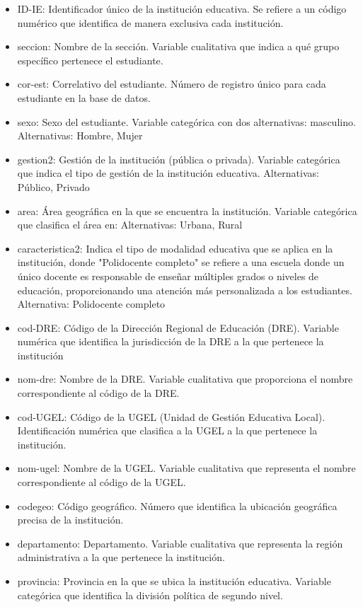 \documentclass[
]{article}
\begin{document}
\begin{itemize}
    \item ID-IE: Identificador único de la institución educativa. Se refiere a un código numérico que identifica de manera exclusiva cada institución.
    \item seccion: Nombre de la sección. Variable cualitativa que indica a qué grupo específico pertenece el estudiante.
    \item cor-est: Correlativo del estudiante. Número de registro único para cada estudiante en la base de datos.
    \item sexo: Sexo del estudiante. Variable categórica con dos alternativas: masculino. Alternativas: Hombre, Mujer
    \item gestion2: Gestión de la institución (pública o privada). Variable categórica que indica el tipo de gestión de la institución educativa. Alternativas: Público, Privado
    \item area: Área geográfica en la que se encuentra la institución. Variable categórica que clasifica el área en: Alternativas: Urbana, Rural
    \item caracteristica2: Indica el tipo de modalidad educativa que se aplica en la institución, donde "Polidocente completo" se refiere a una escuela donde un único docente es responsable de enseñar múltiples grados o niveles de educación, proporcionando una atención más personalizada a los estudiantes. Alternativa: Polidocente completo
    \item cod-DRE: Código de la Dirección Regional de Educación (DRE). Variable numérica que identifica la jurisdicción de la DRE a la que pertenece la institución
    \item nom-dre: Nombre de la DRE. Variable cualitativa que proporciona el nombre correspondiente al código de la DRE.
    \item cod-UGEL: Código de la UGEL (Unidad de Gestión Educativa Local). Identificación numérica que clasifica a la UGEL a la que pertenece la institución.
    \item nom-ugel: Nombre de la UGEL. Variable cualitativa que representa el nombre correspondiente al código de la UGEL.
    \item codegeo: Código geográfico. Número que identifica la ubicación geográfica precisa de la institución.
    \item departamento: Departamento. Variable cualitativa que representa la región administrativa a la que pertenece la institución.
    \item provincia: Provincia en la que se ubica la institución educativa. Variable categórica que identifica la división política de segundo nivel.

\end{itemize}
\end{document}
